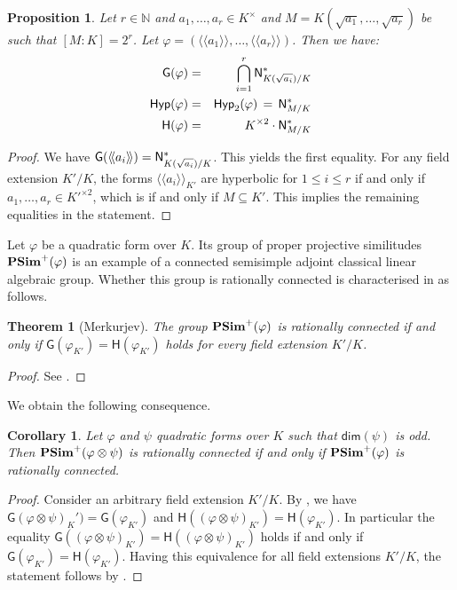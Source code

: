 \documentclass[twoside,11pt]{amsart}
\numberwithin{equation}{section}
\newtheorem{thm}[equation]{Theorem}
\newtheorem{prop}[equation]{Proposition}
\newtheorem{cor}[equation]{Corollary}
\theoremstyle{definition}
\renewcommand{\dim}{\operatorname{\mathsf{dim}}}
\newcommand\N{\operatorname{N}}
\newcommand{\vf}{\varphi}
\newcommand{\mg}[1]{{#1}^{\times}}
\newcommand{\sq}[1]{{#1}^{\times 2}}
\newcommand{\nat}{\mathbb{N}}
\newcommand{\la}{\langle}
\newcommand{\ra}{\rangle}
\newcommand{\lla}{\la\!\la}
\newcommand{\rra}{\ra\!\ra}
\renewcommand{\leq}{\leqslant}
\renewcommand{\N}{\mathsf{N}}
\newcommand{\G}{\mathsf{G}}
\renewcommand{\H}{\mathsf{H}}
\newcommand{\Hyp}{\mathsf{Hyp}}
\renewcommand{\dim}{\mathsf{dim}}
\renewcommand{\leq}{\leqslant}
\begin{document}
\begin{prop}
    Let $r\in\nat$ and $a_1,\dots,a_r\in\mg{K}$ and $M=K(\sqrt{a_1},\dots,\sqrt{a_r})$ be such that $[M:K]=2^r$.
    Let $\varphi=(\lla a_1\rra,\dots,\lla a_r\rra)$.
    Then we have:
    \begin{eqnarray*}
    \G(\varphi) & = & \quad \bigcap_{i=1}^r\N_{K(\sqrt{\vphantom{b}a_i})/K}^\ast\\
    \Hyp(\varphi) & = & \Hyp_2(\varphi) \,= \,\N_{M/K}^\ast\\
    \H(\varphi) & = & \sq{K}\cdot \N_{M/K}^\ast
    \end{eqnarray*}
\end{prop}
\begin{proof}
We have $\G(\lla a_i\rra)=\N_{K(\sqrt{\vphantom{b}a_i})/K}^\ast$.
This yields the first equality.
For any field extension $K'/K$, the forms $\lla a_i\rra_{K'}$ are hyperbolic for $1\leq i\leq r$ if and only if $a_1,\dots,a_r\in\sq{K'}$, which is if and only if $M\subseteq K'$. This implies the remaining equalities in the statement.
\end{proof}

Let $\vf$ be a quadratic form over $K$.
Its group of proper projective similitudes ${\bf PSim}^+(\vf)$ is an example of a connected semisimple adjoint classical linear algebraic group.
Whether this group is rationally connected is characterised in \cite{Mer96} as follows.

\begin{thm}[Merkurjev]
\label{Mer:T1}
The group ${\bf PSim}^+(\vf)$ is rationally connected if and only if $\G(\vf_{K'})=\H(\vf_{K'})$ holds for every field extension $K'/K$.
\end{thm}

\begin{proof}
    See \cite[Theorem 1]{Mer96}.
\end{proof}

We obtain the following consequence.

\begin{cor}\label{no-odd-zd-ratcon}
Let $\varphi$ and $\psi$ quadratic forms over $K$ such that $\dim(\psi)$ is odd.
Then ${\bf PSim}^+(\vf\otimes \psi)$ is rationally connected if and only if ${\bf PSim}^+(\vf)$ is rationally connected.
\end{cor}
\begin{proof}
Consider an arbitrary field extension $K'/K$.
By , we have
$\G(\vf\otimes\psi)_K')=\G(\vf_{K'})$
and $\H((\vf\otimes\psi)_{K'})=\H(\vf_{K'})$.
In particular the equality $\G((\vf\otimes\psi)_{K'})=\H((\vf\otimes\psi)_{K'})$ holds if and only if $\G(\vf_{K'})=\H(\vf_{K'})$.
Having this equivalence for all field extensions $K'/K$, the statement follows by .
\end{proof}
\end{document}
